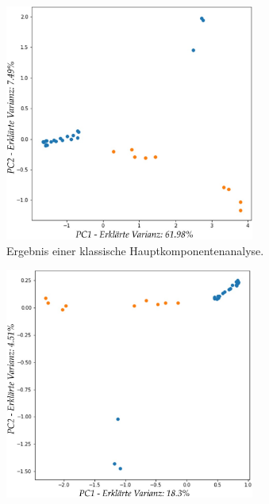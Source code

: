 \begin{figure}
\centering
\begin{subfigure}{0.45\textwidth}
\centering
\includegraphics[width = 0.9\textwidth]{figures/Signal_5_pc_graph.jpg}
\caption{Ergebnis einer klassische Hauptkomponentenanalyse.}
\label{sparse_pca_classical_analysis_pc_graph}
\end{subfigure}
\vspace{0.5cm}
%
\begin{subfigure}{0.45\textwidth}
\centering
\includegraphics[width = 0.9\textwidth]{figures/Signal_5_sparse_pc_graph.jpg}

\end{subfigure}
\end{figure}
